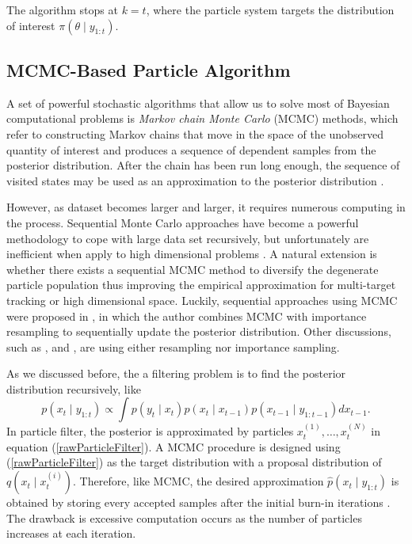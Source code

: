 The algorithm stops at $k=t$, where the particle system targets the distribution of interest $\pi(\theta\mid y_{1:t})$. 


\subsection{MCMC-Based Particle Algorithm}

A set of powerful stochastic algorithms that allow us to solve most of Bayesian computational problems is \textit{Markov chain Monte Carlo} (MCMC) methods, which refer to constructing Markov chains that move in the space of the unobserved quantity of interest and produces a sequence of dependent samples from the posterior distribution. After the chain has been run long enough, the sequence of visited states may be used as an approximation to the posterior distribution \cite{kokkala2016particle}. 

However, as dataset becomes larger and larger, it requires numerous computing in the process. Sequential Monte Carlo approaches have become a powerful methodology to cope with large data set recursively, but unfortunately are inefficient when apply to high dimensional problems \cite{septier2009mcmc}. A natural extension is whether there exists a sequential MCMC method to diversify the degenerate particle population thus improving the empirical approximation for multi-target tracking or high dimensional space. Luckily, sequential approaches using MCMC were proposed in \cite{berzuini1997dynamic}, in which the author combines MCMC with importance resampling to sequentially update the posterior distribution. 
Other discussions, such as \cite{khan2005mcmc}, \cite{golightly2006bayesian} and \cite{pang2008models}, are using either resampling nor importance sampling. 

As we discussed before, the a filtering problem is to find the posterior distribution recursively, like 
\begin{equation}
p(x_t\mid y_{1:t}) \propto \int p(y_t\mid x_t)p(x_t\mid x_{t-1})p(x_{t-1}\mid y_{1:t-1})dx_{t-1}. 
\end{equation} 
In particle filter, the posterior is approximated by particles $x_t^{(1)},\ldots,x_t^{(N)}$ in equation (\ref{rawParticleFilter}). A MCMC procedure is designed using (\ref{rawParticleFilter}) as the target distribution with a proposal distribution of $q(x_t\mid x_t^{(i)})$. Therefore, like MCMC, the desired approximation $\hat{p}(x_t\mid y_{1:t})$ is obtained by storing every accepted samples after the initial burn-in iterations \cite{septier2009mcmc}. The drawback is excessive computation occurs as the number of particles increases at each iteration. 

